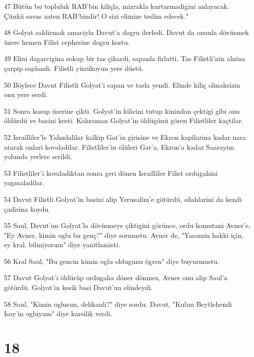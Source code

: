 \par 47 Bütün bu topluluk RAB'bin kiliçla, mizrakla kurtarmadigini anlayacak. Çünkü savas zaten RAB'bindir! O sizi elimize teslim edecek."
\par 48 Golyat saldirmak amaciyla Davut'a dogru ilerledi. Davut da onunla dövüsmek üzere hemen Filist cephesine dogru kostu.
\par 49 Elini dagarcigina sokup bir tas çikardi, sapanla firlatti. Tas Filistli'nin alnina çarpip saplandi. Filistli yüzükoyun yere düstü.
\par 50 Böylece Davut Filistli Golyat'i sapan ve tasla yendi. Elinde kiliç olmaksizin onu yere serdi.
\par 51 Sonra kosup üzerine çikti. Golyat'in kilicini tutup kinindan çektigi gibi onu öldürdü ve basini kesti. Kahraman Golyat'in öldügünü gören Filistliler kaçtilar.
\par 52 Israilliler'le Yahudalilar kalkip Gat'in girisine ve Ekron kapilarina kadar nara atarak onlari kovaladilar. Filistliler'in ölüleri Gat'a, Ekron'a kadar Saarayim yolunda yerlere serildi.
\par 53 Filistliler'i kovaladiktan sonra geri dönen Israilliler Filist ordugahini yagmaladilar.
\par 54 Davut Filistli Golyat'in basini alip Yerusalim'e götürdü, silahlarini da kendi çadirina koydu.
\par 55 Saul, Davut'un Golyat'la dövüsmeye çiktigini görünce, ordu komutani Avner'e, "Ey Avner, kimin oglu bu genç?" diye sormustu. Avner de, "Yasamin hakki için, ey kral, bilmiyorum" diye yanitlamisti.
\par 56 Kral Saul, "Bu gencin kimin oglu oldugunu ögren" diye buyurmustu.
\par 57 Davut Golyat'i öldürüp ordugaha döner dönmez, Avner onu alip Saul'a götürdü. Golyat'in kesik basi Davut'un elindeydi.
\par 58 Saul, "Kimin oglusun, delikanli?" diye sordu. Davut, "Kulun Beytlehemli Isay'in ogluyum" diye karsilik verdi.

\chapter{18}

